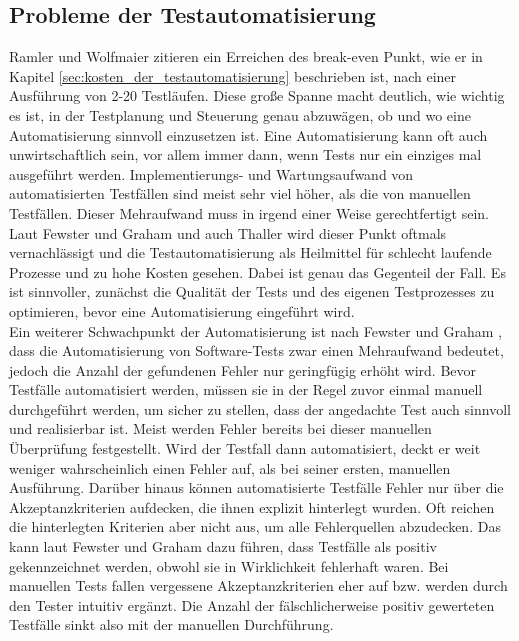 \subsection{Probleme der Testautomatisierung}
\label{sec:probleme_der_testautomatisierung}
Ramler und Wolfmaier \cite{ramler_economic_2006} zitieren ein Erreichen des break-even Punkt, wie er in Kapitel \ref{sec:kosten_der_testautomatisierung} beschrieben ist, nach einer Ausführung von 2-20 Testläufen. Diese große Spanne macht deutlich, wie wichtig es ist, in der Testplanung und Steuerung genau abzuwägen, ob und wo eine Automatisierung sinnvoll einzusetzen ist. Eine Automatisierung kann oft auch unwirtschaftlich sein, vor allem immer dann, wenn Tests nur ein einziges mal ausgeführt werden. Implementierungs- und Wartungsaufwand von automatisierten Testfällen sind meist sehr viel höher, als die von manuellen Testfällen. Dieser Mehraufwand muss in irgend einer Weise gerechtfertigt sein. Laut Fewster und Graham \cite[vgl. S. 22 ff.]{fewster_software_1999} und auch Thaller \cite[vgl. S.230 ff.]{thaller_software-test_2002} wird dieser Punkt oftmals vernachlässigt und die Testautomatisierung als Heilmittel für schlecht laufende Prozesse und zu hohe Kosten gesehen. Dabei ist genau das Gegenteil der Fall. Es ist sinnvoller, zunächst die Qualität der Tests und des eigenen Testprozesses zu optimieren, bevor eine Automatisierung eingeführt wird.\\ 
Ein weiterer Schwachpunkt der Automatisierung ist nach Fewster und Graham \cite[vgl. S. 22 ff.]{fewster_software_1999}, dass die Automatisierung von Software-Tests zwar einen Mehraufwand bedeutet, jedoch die Anzahl der gefundenen Fehler nur geringfügig erhöht wird.
Bevor Testfälle automatisiert werden, müssen sie in der Regel zuvor einmal manuell durchgeführt werden, um sicher zu stellen, dass der angedachte Test auch sinnvoll und realisierbar ist. Meist werden Fehler bereits bei dieser manuellen Überprüfung festgestellt. Wird der Testfall dann automatisiert, deckt er weit weniger wahrscheinlich einen Fehler auf, als bei seiner ersten, manuellen Ausführung. Darüber hinaus können automatisierte Testfälle Fehler nur über die Akzeptanzkriterien aufdecken, die ihnen explizit hinterlegt wurden. Oft reichen die hinterlegten Kriterien aber nicht aus, um alle Fehlerquellen abzudecken. Das kann laut Fewster und Graham \cite[vgl. S. 23 ff.]{fewster_software_1999} dazu führen, dass Testfälle als positiv gekennzeichnet werden, obwohl sie in Wirklichkeit fehlerhaft waren. Bei manuellen Tests fallen vergessene Akzeptanzkriterien eher auf bzw. werden durch den Tester intuitiv ergänzt. Die Anzahl der fälschlicherweise positiv gewerteten Testfälle sinkt also mit der manuellen Durchführung.\\
